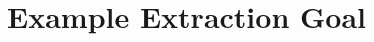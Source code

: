 \section{Example Extraction Goal}\label{app:goal}

\inputminted[linenos, tabsize=4]{rust}{snippets/goal.rs}